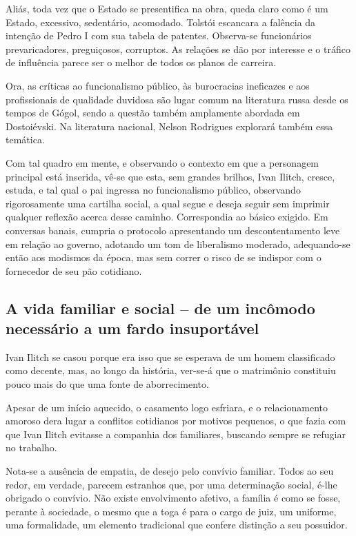 \documentclass[12pt]{extarticle}
\begin{document}
Aliás, toda vez que o Estado se presentifica na obra, queda claro como é
um Estado, excessivo, sedentário, acomodado. Tolstói escancara a
falência da intenção de Pedro I com sua tabela de patentes. Observa-se
funcionários prevaricadores, preguiçosos, corruptos. As relações se dão
por interesse e o tráfico de influência parece ser o melhor de todos os
planos de carreira.






Ora, as críticas ao funcionalismo público, às burocracias ineficazes e
aos profissionais de qualidade duvidosa são lugar comum na literatura
russa desde os tempos de Gógol, sendo a questão também amplamente
abordada em Dostoiévski. Na literatura nacional, Nelson Rodrigues
explorará também essa temática.

Com tal quadro em mente, e observando o contexto em que a personagem
principal está inserida, vê-se que esta, sem grandes brilhos, Ivan
Ilitch, cresce, estuda, e tal qual o pai ingressa no funcionalismo
público, observando rigorosamente uma cartilha social, a qual segue e
deseja seguir sem imprimir qualquer reflexão acerca desse caminho.
Correspondia ao básico exigido. Em conversas banais, cumpria o protocolo
apresentando um descontentamento leve em relação ao governo, adotando um
tom de liberalismo moderado, adequando-se então aos modismos da época,
mas sem correr o risco de se indispor com o fornecedor de seu pão
cotidiano.

\subsection{A vida familiar e social -- de um incômodo necessário a um fardo
insuportável}

Ivan Ilitch se casou porque era isso que se esperava de um homem
classificado como decente, mas, ao longo da história, ver-se-á que o
matrimônio constituiu pouco mais do que uma fonte de aborrecimento.

Apesar de um início aquecido, o casamento logo esfriara, e o
relacionamento amoroso dera lugar a conflitos cotidianos por motivos
pequenos, o que fazia com que Ivan Ilitch evitasse a companhia dos
familiares, buscando sempre se refugiar no trabalho.

Nota-se a ausência de empatia, de desejo pelo convívio familiar. Todos
ao seu redor, em verdade, parecem estranhos que, por uma determinação
social, é-lhe obrigado o convívio. Não existe envolvimento afetivo, a
família é como se fosse, perante à sociedade, o mesmo que a toga é para
o cargo de juiz, um uniforme, uma formalidade, um elemento tradicional
que confere distinção a seu possuidor.
\end{document}
